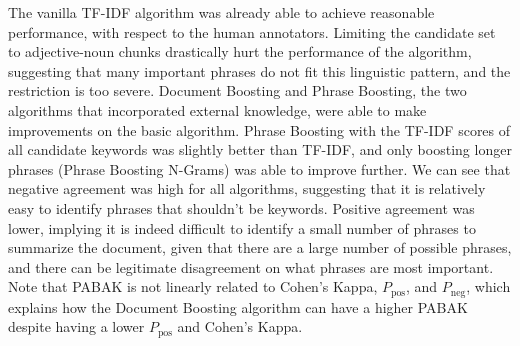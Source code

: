 The vanilla TF-IDF algorithm was already able to achieve reasonable performance, with respect to the human annotators. Limiting the candidate set to adjective-noun chunks drastically hurt the performance of the algorithm, suggesting that many important phrases do not fit this linguistic pattern, and the restriction is too severe. Document Boosting and Phrase Boosting, the two algorithms that incorporated external knowledge, were able to make improvements on the basic algorithm. Phrase Boosting with the TF-IDF scores of all candidate keywords was slightly better than TF-IDF, and only boosting longer phrases (Phrase Boosting N-Grams) was able to improve further. We can see that negative agreement was high for all algorithms, suggesting that it is relatively easy to identify phrases that shouldn't be keywords. Positive agreement was lower, implying it is indeed difficult to identify a small number of phrases to summarize the document, given that there are a large number of possible phrases, and there can be legitimate disagreement on what phrases are most important. Note that PABAK is not linearly related to Cohen's Kappa, $P_{\text{pos}}$, and $P_{\text{neg}}$, which explains how the Document Boosting algorithm can have a higher PABAK despite having a lower $P_{\text{pos}}$ and Cohen's Kappa.
